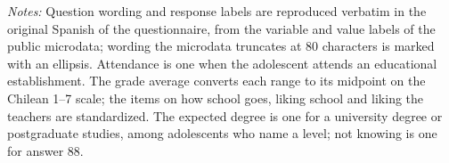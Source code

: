 \begin{table}[htbp]
\begin{threeparttable}
\begin{tabular}{@{}p{68pt}p{212pt}p{150pt}@{}}
\bottomrule
\end{tabular}
\begin{wpnotes}
\textit{Notes:} Question wording and response labels are reproduced verbatim in the original Spanish of the questionnaire, from the variable and value labels of the public microdata; wording the microdata truncates at 80 characters is marked with an ellipsis. Attendance is one when the adolescent attends an educational establishment. The grade average converts each range to its midpoint on the Chilean 1--7 scale; the items on how school goes, liking school and liking the teachers are standardized. The expected degree is one for a university degree or postgraduate studies, among adolescents who name a level; not knowing is one for answer 88.
\end{wpnotes}
\end{threeparttable}
\end{table}
